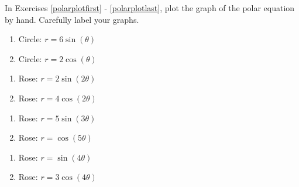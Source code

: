 \documentclass{ximera}
\begin{document}
	\author{Stitz-Zeager}



In Exercises \ref{polarplotfirst} - \ref{polarplotlast}, plot the graph of the polar equation by hand.  Carefully label your graphs.

\begin{multicols}{2}

\begin{enumerate}

\item Circle: $r = 6\sin(\theta)$ \label{polarplotfirst}
\item Circle: $r = 2\cos(\theta)$ 

\setcounter{HW}{\value{enumi}}

\end{enumerate}

\end{multicols}

\begin{multicols}{2} 

\begin{enumerate}

\setcounter{enumi}{\value{HW}}

\item Rose: $r = 2\sin(2\theta)$ 
\item Rose: $r = 4\cos(2\theta)$ 

\setcounter{HW}{\value{enumi}}

\end{enumerate}

\end{multicols}

\begin{multicols}{2} 

\begin{enumerate}

\setcounter{enumi}{\value{HW}}

\item Rose: $r = 5\sin(3\theta)$ 
\item Rose: $r = \cos(5\theta)$ 

\setcounter{HW}{\value{enumi}}

\end{enumerate}

\end{multicols}

\begin{multicols}{2} 

\begin{enumerate}

\setcounter{enumi}{\value{HW}}

\item Rose: $r = \sin(4\theta)$ 
\item Rose: $r = 3\cos(4\theta)$ \label{roseexercise8petal}

\setcounter{HW}{\value{enumi}}

\end{enumerate}

\end{multicols}
\end{document}
